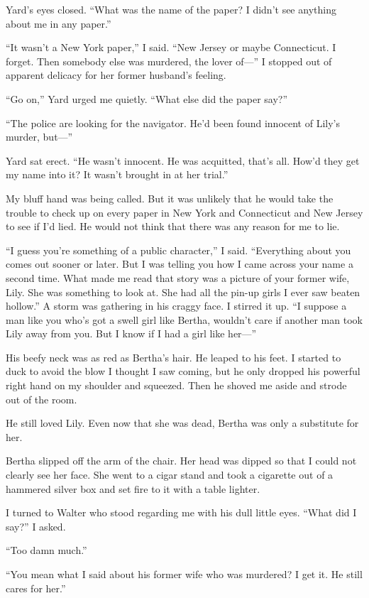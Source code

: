 \documentclass{novel}
\begin{document}
{Yard’s eyes closed. “What was the name of the paper? I didn’t see anything about me in any paper.”

“It wasn’t a New York paper,” I said. “New Jersey or maybe Connecticut. I forget. Then somebody else was murdered, the lover of—” I stopped out of apparent delicacy for her former husband’s feeling.

“Go on,” Yard urged me quietly. “What else did the paper say?”

“The police are looking for the navigator. He’d been found innocent of Lily’s murder, but—”

Yard sat erect. “He wasn’t innocent. He was acquitted, that’s all. How’d they get my name into it? It wasn’t brought in at her trial.”

My bluff hand was being called. But it was unlikely that he would take the trouble to check up on every paper in New York and Connecticut and New Jersey to see if I’d lied. He would not think that there was any reason for me to lie.

“I guess you’re something of a public character,” I said. “Everything about you comes out sooner or later. But I was telling you how I came across your name a second time. What made me read that story was a picture of your former wife, Lily. She was something to look at. She had all the pin-up girls I ever saw beaten hollow.” A storm was gathering in his craggy face. I stirred it up. “I suppose a man like you who’s got a swell girl like Bertha, wouldn’t care if another man took Lily away from you. But I know if I had a girl like her—”

His beefy neck was as red as Bertha’s hair. He leaped to his feet. I started to duck to avoid the blow I thought I saw coming, but he only dropped his powerful right hand on my shoulder and squeezed. Then he shoved me aside and strode out of the room.

He still loved Lily. Even now that she was dead, Bertha was only a substitute for her.

Bertha slipped off the arm of the chair. Her head was dipped so that I could not clearly see her face. She went to a cigar stand and took a cigarette out of a hammered silver box and set fire to it with a table lighter.

I turned to Walter who stood regarding me with his dull little eyes. “What did I say?” I asked.

“Too damn much.”

“You mean what I said about his former wife who was murdered? I get it. He still cares for her.”

}
\end{document}
